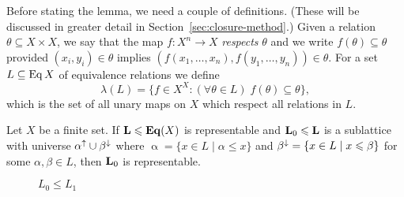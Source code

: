 Before stating the lemma, we need a couple of definitions.  (These will be
discussed in greater detail in Section~\ref{sec:closure-method}.)
Given a relation $\theta \subseteq X\times X$, we say that the map 
$f: X^n\rightarrow X$ \emph{respects} $\theta$ and we write 
$f(\theta) \subseteq \theta$ provided $(x_i, y_i)\in \theta$ implies
$(f(x_1, \dots, x_n), f(y_1, \dots, y_n))\in \theta$.
For a set $L\subseteq \operatorname{Eq} X$ of equivalence relations we define
\[
\lambda(L) = \{f\in X^X: (\forall \theta \in L) \; f(\theta) \subseteq \theta \},
\]
which is the set of all unary maps on $X$ which respect all relations in $L$.
\begin{lemma} 
  \label{lemma:union-filter-ideal}
  Let $X$ be a finite set.
  If $\mathbf{L} \leqslant \mathbf{Eq}(X)$ is representable and $\mathbf{L}_0\leqslant \mathbf{L}$ is a sublattice with universe
  $\alpha^{\uparrow}\cup \beta^{\downarrow}$ where $\upalpha=\{x\in L \mid \alpha \leq x\}$ and 
  $\beta^{\downarrow}=\{x\in L \mid x\leqslant \beta\}$ for some $\alpha, \beta \in L$, then $\mathbf{L}_0$ is representable.
\end{lemma}

\vskip3mm

\begin{figure}[htp]
\begin{center}
\end{center}
\caption{$L_0 \le L_1$}
\end{figure}

\vskip3mm

